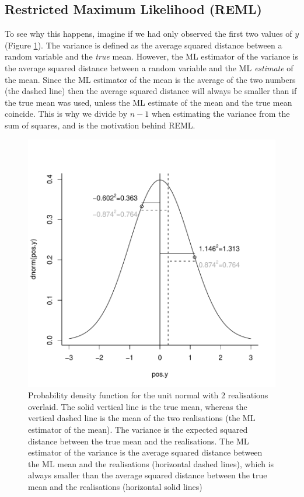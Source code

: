 \documentclass{article}
\begin{document}
\subsection{Restricted Maximum Likelihood (REML)}

To see why this happens, imagine if we had only observed the first two values of $y$ (Figure \ref{muvar-fig}). The variance is defined as the average squared distance between a random variable and the \emph{true} mean. However, the ML estimator of the variance is the average squared distance between a random variable and the ML \emph{estimate} of the mean. Since the ML estimator of the mean is the average of the two numbers (the dashed line) then the average squared distance will always be smaller than if the true mean was used, unless the ML estimate of the mean and the true mean coincide. This is why we divide by $n-1$ when estimating the variance from the sum of squares, and is the motivation behind REML.

\iftalk
\else
\fi

\begin{figure}[!h]
\begin{center}
\includegraphics{Lecture1-023}
\end{center}
\caption{Probability density function for the unit normal with 2 realisations overlaid. The solid vertical line is the true mean, whereas the vertical dashed line is the mean of the two realisations (the ML estimator of the mean). The variance is the expected squared distance between the true mean and the realisations. The ML estimator of the variance is the average squared distance between the ML mean and the realisations (horizontal dashed lines), which is always smaller than the average squared distance between the true mean and the realisations (horizontal solid lines)}
\label{muvar-fig}
\end{figure}
\end{document}
